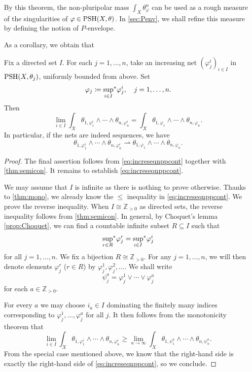 By this theorem, the non-pluripolar mass $\int_X \theta_{\varphi}^n$ can be used as a rough measure of the singularities of $\varphi\in \PSH(X,\theta)$. In \cref{sec:Penv}, we shall refine this measure by defining the notion of $P$-envelope.

As a corollary, we obtain that
\begin{corollary}\label{cor:incseqnppcont}
Fix a directed set $I$.
    For each $j=1,\ldots,n$, take an increasing net $(\varphi_j^i)_{i\in I}$ in $\PSH(X,\theta_j)$, uniformly bounded from above. Set
    \[
    \varphi_j\coloneqq \uscsup[i\in I] \varphi_j^i,\quad j=1,\ldots,n.
    \]
    Then
    \begin{equation}\label{eq:increseqnppcont}
    \lim_{i\in I}\int_X \theta_{1,\varphi_1^i}\wedge \cdots \wedge \theta_{n,\varphi_n^i} = \int_X \theta_{1,\varphi_1}\wedge \cdots \wedge \theta_{n,\varphi_n}.
\end{equation}
In particular, if the nets are indeed sequences, we have
\[
\theta_{1,\varphi_1^i}\wedge \cdots \wedge \theta_{n,\varphi_n^i} \rightharpoonup \theta_{1,\varphi_1}\wedge \cdots \wedge \theta_{n,\varphi_n}.
\]
\end{corollary}
\begin{proof}
The final assertion follows from \eqref{eq:increseqnppcont} together with \cref{thm:semicon}. It remains to establish \eqref{eq:increseqnppcont}.

We may assume that $I$ is infinite as there is nothing to prove otherwise. Thanks to \cref{thm:mono}, we already know the $\leq$ inequality in \eqref{eq:increseqnppcont}. We prove the reverse inequality.
When $I\cong\mathbb{Z}_{>0}$ as directed sets, the reverse inequality follows from \cref{thm:semicon}. In general, by Choquet's lemma \cref{prop:Choquet}, we can find a countable infinite subset $R\subseteq I$ such that
\[
\uscsup[r\in R]\varphi^r_j=\uscsup[i\in I]\varphi^i_j
\]
for all $j=1,\ldots,n$.
We fix a bijection $R\cong \mathbb{Z}_{>0}$. For any $j=1,\ldots,n$, we will then denote elements $\varphi_j^r$ ($r\in R$) by $\varphi_j^1,\varphi_j^2,\dots$. We shall write
\[
\psi_j^a=\varphi_j^1\lor \cdots \lor \varphi_j^a
\]
for each $a\in \mathbb{Z}_{>0}$.

For every $a$ we may choose $i_a\in I$ dominating the finitely many indices corresponding to $\varphi_j^1,\ldots,\varphi_j^a$ for all $j$. It then follows from the monotonicity theorem that
\[
\lim_{i\in I}\int_X \theta_{1,\varphi_1^i}\wedge \cdots \wedge \theta_{n,\varphi_n^i}\geq \lim_{a\to \infty}\int_X \theta_{1,\psi_1^a}\wedge \cdots \wedge \theta_{n,\psi_n^a}.
\]
From the special case mentioned above, we know that the right-hand side is exactly the right-hand side of \eqref{eq:increseqnppcont}, so we conclude.
\end{proof}


